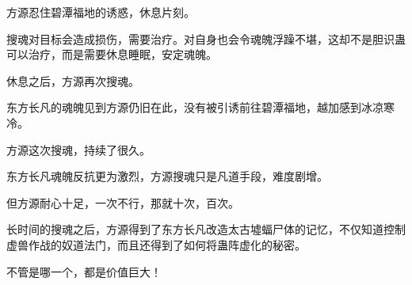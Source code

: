 \begin{this_body}
方源忍住碧潭福地的诱惑，休息片刻。

搜魂对目标会造成损伤，需要治疗。对自身也会令魂魄浮躁不堪，这却不是胆识蛊可以治疗，而是需要休息睡眠，安定魂魄。

休息之后，方源再次搜魂。

东方长凡的魂魄见到方源仍旧在此，没有被引诱前往碧潭福地，越加感到冰凉寒冷。

方源这次搜魂，持续了很久。

东方长凡魂魄反抗更为激烈，方源搜魂只是凡道手段，难度剧增。

但方源耐心十足，一次不行，那就十次，百次。

长时间的搜魂之后，方源得到了东方长凡改造太古墟蝠尸体的记忆，不仅知道控制虚兽作战的奴道法门，而且还得到了如何将蛊阵虚化的秘密。

不管是哪一个，都是价值巨大！

\end{this_body}

